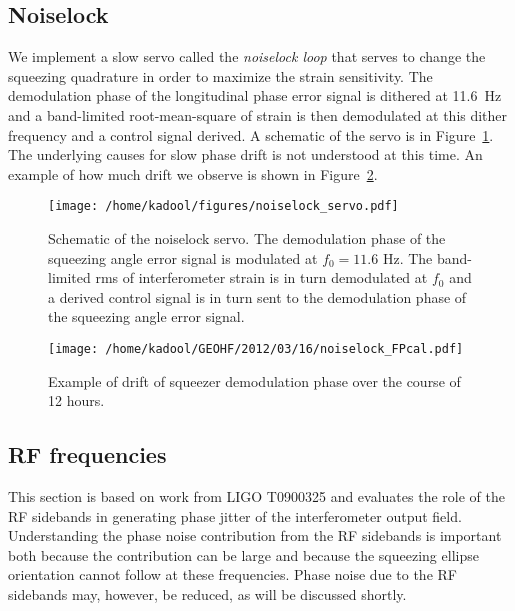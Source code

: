 \documentclass{ligodoc}
\begin{document}
\subsection{Noiselock}
We implement a slow servo called the \emph{noiselock loop} that serves
to change the squeezing quadrature in order to maximize the strain
sensitivity. The demodulation phase of the longitudinal phase error
signal is dithered at 11.6~Hz and a band-limited root-mean-square of
strain is then demodulated at this dither frequency and a control
signal derived. A schematic of the servo is in
Figure~\ref{fig:noiselockservo}. The underlying causes for slow phase
drift is not understood at this time. An example of how much drift we
observe is shown in Figure~\ref{fig:noiselock}.

\begin{figure}
\begin{centering}
\texttt{[image: /home/kadool/figures/noiselock\_servo.pdf]}
\caption{Schematic of the noiselock servo. The demodulation phase of
  the squeezing angle error signal is modulated at $f_0=11.6$ Hz. The
  band-limited rms of interferometer strain is in turn demodulated at
  $f_0$ and a derived control signal is in turn sent to the
  demodulation phase of the squeezing angle error signal.}
\label{fig:noiselockservo}
\end{centering}
\end{figure}


\begin{figure}
\begin{centering}
\texttt{[image: /home/kadool/GEOHF/2012/03/16/noiselock\_FPcal.pdf]}
\caption{Example of drift of squeezer demodulation phase over the
  course of 12 hours.}
\label{fig:noiselock}
\end{centering}
\end{figure}



\subsection{RF frequencies}
This section is based on work from LIGO T0900325 and evaluates the
role of the RF sidebands in generating phase jitter of the
interferometer output field. Understanding the phase noise
contribution from the RF sidebands is important both because the
contribution can be large and because the squeezing ellipse
orientation cannot follow at these frequencies. Phase noise due to the
RF sidebands may, however, be reduced, as will be discussed shortly.
\end{document}
